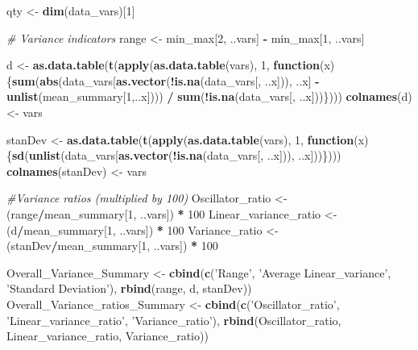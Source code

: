 \documentclass[]{article}
\newenvironment{Shaded}{\begin{snugshade}}{\end{snugshade}}
\newcommand{\KeywordTok}[1]{\textcolor[rgb]{0.13,0.29,0.53}{\textbf{#1}}}
\newcommand{\DecValTok}[1]{\textcolor[rgb]{0.00,0.00,0.81}{#1}}
\newcommand{\StringTok}[1]{\textcolor[rgb]{0.31,0.60,0.02}{#1}}
\newcommand{\CommentTok}[1]{\textcolor[rgb]{0.56,0.35,0.01}{\textit{#1}}}
\newcommand{\ControlFlowTok}[1]{\textcolor[rgb]{0.13,0.29,0.53}{\textbf{#1}}}
\newcommand{\OperatorTok}[1]{\textcolor[rgb]{0.81,0.36,0.00}{\textbf{#1}}}
\newcommand{\NormalTok}[1]{#1}
\begin{document}
\begin{Shaded}
\begin{Highlighting}[]
\NormalTok{qty <-}\StringTok{ }\KeywordTok{dim}\NormalTok{(data_vars)[}\DecValTok{1}\NormalTok{]}

\CommentTok{# Variance indicators}
\NormalTok{range <-}\StringTok{ }\NormalTok{min_max[}\DecValTok{2}\NormalTok{, ..vars] }\OperatorTok{-}\StringTok{ }\NormalTok{min_max[}\DecValTok{1}\NormalTok{, ..vars]}

\NormalTok{d <-}\StringTok{ }\KeywordTok{as.data.table}\NormalTok{(}\KeywordTok{t}\NormalTok{(}\KeywordTok{apply}\NormalTok{(}\KeywordTok{as.data.table}\NormalTok{(vars), }\DecValTok{1}\NormalTok{, }\ControlFlowTok{function}\NormalTok{(x)\{}\KeywordTok{sum}\NormalTok{(}\KeywordTok{abs}\NormalTok{(data_vars[}\KeywordTok{as.vector}\NormalTok{(}\OperatorTok{!}\KeywordTok{is.na}\NormalTok{(data_vars[, ..x])), ..x] }\OperatorTok{-}\StringTok{ }\KeywordTok{unlist}\NormalTok{(mean_summary[}\DecValTok{1}\NormalTok{,..x]))) }\OperatorTok{/}\StringTok{ }\KeywordTok{sum}\NormalTok{(}\OperatorTok{!}\KeywordTok{is.na}\NormalTok{(data_vars[, ..x]))\})))}
\KeywordTok{colnames}\NormalTok{(d) <-}\StringTok{ }\NormalTok{vars}

\NormalTok{stanDev <-}\StringTok{ }\KeywordTok{as.data.table}\NormalTok{(}\KeywordTok{t}\NormalTok{(}\KeywordTok{apply}\NormalTok{(}\KeywordTok{as.data.table}\NormalTok{(vars), }\DecValTok{1}\NormalTok{, }\ControlFlowTok{function}\NormalTok{(x)\{}\KeywordTok{sd}\NormalTok{(}\KeywordTok{unlist}\NormalTok{(data_vars[}\KeywordTok{as.vector}\NormalTok{(}\OperatorTok{!}\KeywordTok{is.na}\NormalTok{(data_vars[, ..x])), ..x]))\})))}
\KeywordTok{colnames}\NormalTok{(stanDev) <-}\StringTok{ }\NormalTok{vars}


\CommentTok{#Variance ratios (multiplied by 100)}
\NormalTok{Oscillator_ratio <-}\StringTok{ }\NormalTok{(range}\OperatorTok{/}\NormalTok{mean_summary[}\DecValTok{1}\NormalTok{, ..vars]) }\OperatorTok{*}\StringTok{ }\DecValTok{100}
\NormalTok{Linear_variance_ratio <-}\StringTok{ }\NormalTok{(d}\OperatorTok{/}\NormalTok{mean_summary[}\DecValTok{1}\NormalTok{, ..vars]) }\OperatorTok{*}\StringTok{ }\DecValTok{100}
\NormalTok{Variance_ratio <-}\StringTok{ }\NormalTok{(stanDev}\OperatorTok{/}\NormalTok{mean_summary[}\DecValTok{1}\NormalTok{, ..vars]) }\OperatorTok{*}\StringTok{ }\DecValTok{100}

\NormalTok{Overall_Variance_Summary <-}\StringTok{ }\KeywordTok{cbind}\NormalTok{(}\KeywordTok{c}\NormalTok{(}\StringTok{'Range'}\NormalTok{, }\StringTok{'Average Linear_variance'}\NormalTok{, }\StringTok{'Standard Deviation'}\NormalTok{), }\KeywordTok{rbind}\NormalTok{(range, d, stanDev))}
\NormalTok{Overall_Variance_ratios_Summary <-}\StringTok{ }\KeywordTok{cbind}\NormalTok{(}\KeywordTok{c}\NormalTok{(}\StringTok{'Oscillator_ratio'}\NormalTok{, }\StringTok{'Linear_variance_ratio'}\NormalTok{, }\StringTok{'Variance_ratio'}\NormalTok{), }\KeywordTok{rbind}\NormalTok{(Oscillator_ratio, Linear_variance_ratio, Variance_ratio))}


\end{Highlighting}
\end{Shaded}
\end{document}
